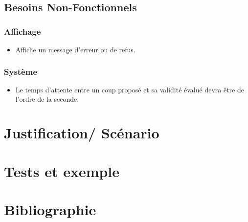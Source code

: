 \documentclass{article}[a4paper, 12pt]
\begin{document}
\subsection{Besoins Non-Fonctionnels}

\subsubsection{Affichage}
\begin{itemize}
    \item Affiche un message d'erreur ou de refus.
\end{itemize}

\subsubsection{Système}
\begin{itemize}
    \item Le temps d'attente entre un coup proposé et sa validité évalué devra être de l'ordre de la seconde.
\end{itemize}

\section{Justification/ Scénario}



\section{Tests et exemple}


\section{Bibliographie}

\end{document}
